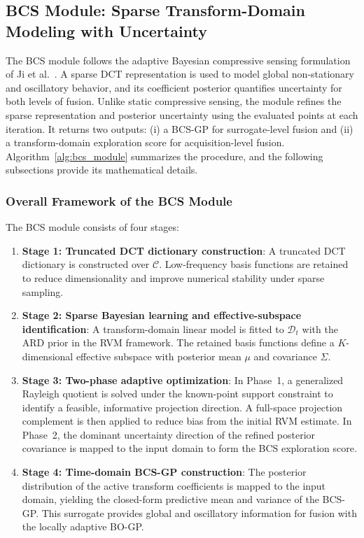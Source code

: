 \documentclass[lettersize,journal]{IEEEtran}
\begin{document}
\subsection{BCS Module: Sparse Transform-Domain Modeling with Uncertainty}
The BCS module follows the adaptive Bayesian compressive sensing formulation of Ji et al.\ \cite{JiXueCarin2008BCS}. A sparse DCT representation is used to model global non-stationary and oscillatory behavior, and its coefficient posterior quantifies uncertainty for both levels of fusion. Unlike static compressive sensing, the module refines the sparse representation and posterior uncertainty using the evaluated points at each iteration. It returns two outputs: (i) a BCS-GP for surrogate-level fusion and (ii) a transform-domain exploration score for acquisition-level fusion. Algorithm~\ref{alg:bcs_module} summarizes the procedure, and the following subsections provide its mathematical details.

\subsubsection{Overall Framework of the BCS Module}
The BCS module consists of four stages:
\begin{enumerate}
    \item \textbf{Stage 1: Truncated DCT dictionary construction}: A truncated DCT dictionary is constructed over $\mathcal{C}$. Low-frequency basis functions are retained to reduce dimensionality and improve numerical stability under sparse sampling.
    \item \textbf{Stage 2: Sparse Bayesian learning and effective-subspace identification}: A transform-domain linear model is fitted to $\mathcal{D}_t$ with the ARD prior in the RVM framework. The retained basis functions define a $K$-dimensional effective subspace with posterior mean $\mu$ and covariance $\Sigma$.
    \item \textbf{Stage 3: Two-phase adaptive optimization}: In Phase~1, a generalized Rayleigh quotient is solved under the known-point support constraint to identify a feasible, informative projection direction. A full-space projection complement is then applied to reduce bias from the initial RVM estimate. In Phase~2, the dominant uncertainty direction of the refined posterior covariance is mapped to the input domain to form the BCS exploration score.
    \item \textbf{Stage 4: Time-domain BCS-GP construction}: The posterior distribution of the active transform coefficients is mapped to the input domain, yielding the closed-form predictive mean and variance of the BCS-GP. This surrogate provides global and oscillatory information for fusion with the locally adaptive BO-GP.
\end{enumerate}
\end{document}
